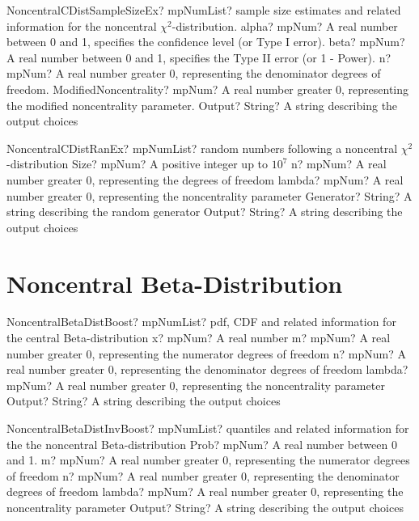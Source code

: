 \documentclass[12pt,a4paper,openany]{book}
\begin{document}
\begin{mpFunctionsExtract}
\mpFunctionFiveNotImplemented
{NoncentralCDistSampleSizeEx? mpNumList? sample size estimates and related information for the noncentral $\chi^2$-distribution.}
{alpha? mpNum? A real number between 0 and 1, specifies the confidence level (or Type I error).}
{beta? mpNum?  A real number between 0 and 1, specifies the Type II error (or 1 - Power).}
{n? mpNum? A real number greater 0, representing the denominator degrees of freedom.}
{ModifiedNoncentrality? mpNum? A real number greater 0, representing the modified noncentrality parameter.}
{Output? String? A string describing the output choices}
\end{mpFunctionsExtract}

\begin{mpFunctionsExtract}
\mpFunctionFiveNotImplemented
{NoncentralCDistRanEx? mpNumList? random numbers following a noncentral $\chi^2$-distribution}
{Size? mpNum? A positive integer up to $10^7$}
{n? mpNum? A real number greater 0, representing the degrees of freedom}
{lambda? mpNum? A real number greater 0, representing the noncentrality parameter}
{Generator? String? A string describing the random generator}
{Output? String? A string describing the output choices}
\end{mpFunctionsExtract}

\section{Noncentral Beta-Distribution}

\begin{mpFunctionsExtract}
\mpFunctionFiveNotImplemented
{NoncentralBetaDistBoost? mpNumList? pdf, CDF and related information for the central Beta-distribution}
{x? mpNum? A real number}
{m? mpNum? A real number greater 0, representing the numerator  degrees of freedom}
{n? mpNum? A real number greater 0, representing the denominator degrees of freedom}
{lambda? mpNum? A real number greater 0, representing the noncentrality parameter}
{Output? String? A string describing the output choices}
\end{mpFunctionsExtract}

\begin{mpFunctionsExtract}
\mpFunctionFiveNotImplemented
{NoncentralBetaDistInvBoost? mpNumList? quantiles and related information for the the noncentral Beta-distribution}
{Prob? mpNum? A real number between 0 and 1.}
{m? mpNum? A real number greater 0, representing the numerator  degrees of freedom}
{n? mpNum? A real number greater 0, representing the denominator degrees of freedom}
{lambda? mpNum? A real number greater 0, representing the noncentrality parameter}
{Output? String? A string describing the output choices}
\end{mpFunctionsExtract}
\end{document}
